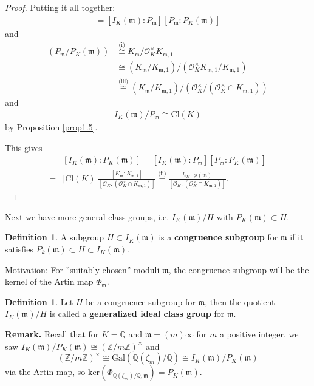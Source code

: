 \documentclass{article}
\theoremstyle{definition}
\newtheorem{defn}[theorem]{Definition}
\begin{document}
\begin{proof}
    Putting it all together:
    \begin{align*}
        [I_K(\mathfrak{m}):P_K(\mathfrak{m})] = [I_K(\mathfrak{m}):P_{\mathfrak{m}}][P_{\mathfrak{m}}:P_K(\mathfrak{m})]
    \end{align*}
    and \begin{align*}
        (P_\mathfrak{m}/P_K(\mathfrak{m})) &\stackrel{\text{(i)}}{\cong}  K_{\mathfrak{m}}/\mathcal{O}_K^\times K_{\mathfrak{m},1} \\
        &\cong (K_{\mathfrak{m}}/K_{\mathfrak{m},1})/(\mathcal{O}_K^\times K_{\mathfrak{m},1}/K_{\mathfrak{m},1}) \\
        &\stackrel{\text{(iii)}}{\cong}  (K_{\mathfrak{m}}/K_{\mathfrak{m},1})/(\mathcal{O}_K^\times/(\mathcal{O}_K^\times \cap K_{\mathfrak{m},1}))
    \end{align*}
    and \begin{align*}
        I_K(\mathfrak{m})/P_\mathfrak{m} \cong \text{Cl}(K)
    \end{align*}
    by Proposition \ref{prop1.5}.
    \vspace{1mm}
     
    This gives 
    \begin{align*}
        &[I_K(\mathfrak{m}) : P_K(\mathfrak{m})] = [I_K(\mathfrak{m}) : P_{\mathfrak{m}}][P_\mathfrak{m} : P_K(\mathfrak{m})] \\
        =& |\text{Cl}(K)| \frac{[K_{\mathfrak{m}}:K_{\mathfrak{m},1}]}{[\mathcal{O}_K: (\mathcal{O}_K^\times \cap K_{\mathfrak{m},1})]} \stackrel{\text{(ii)}}{=}  \frac{h_K \cdot \phi(\mathfrak{\mathfrak{m}})}{[\mathcal{O}_K : (\mathcal{O}_K^\times \cap K_{\mathfrak{m},1})]}.
    \end{align*}
\end{proof}
Next we have more general class groups, i.e. $I_K(\mathfrak{m})/H$ with $P_K(\mathfrak{m}) \subset H$.
\begin{defn}
    A subgroup $H \subset I_K(\mathfrak{m})$ is a \textbf{congruence subgroup} for $\mathfrak{m}$ if it satisfies $P_k(\mathfrak{m}) \subset  H \subset I_K(\mathfrak{m})$.
\end{defn}
Motivation: For ''suitably chosen'' moduli $\mathfrak{m}$, the congruence subgroup will be the kernel of the Artin map $\Phi_{\mathfrak{m}}$.

\begin{defn}
    Let $H$ be a congruence subgroup for $\mathfrak{m}$, then the quotient $I_K(\mathfrak{m})/H$ is called a \textbf{generalized ideal class group} for $\mathfrak{m}$.
\end{defn}
\textbf{Remark.} Recall that for $K=\mathbb{Q}$ and $\mathfrak{m}=(m)\infty$ for $m$ a positive integer, we saw $I_K(\mathfrak{m})/P_K(\mathfrak{m}) \cong (\mathbb{Z}/m\mathbb{Z})^\times$ and \[
(\mathbb{Z}/m\mathbb{Z})^\times \cong \text{Gal}(\mathbb{Q}(\zeta_m)/\mathbb{Q}) \cong I_K(\mathfrak{m})/P_K(\mathfrak{m})
\]
via the Artin map, so $\text{ker}(\Phi_{\mathbb{Q}(\zeta_m)/\mathbb{Q},\mathfrak{m}}) = P_K(\mathfrak{m})$.
\vspace{1mm}
 
\end{document}
